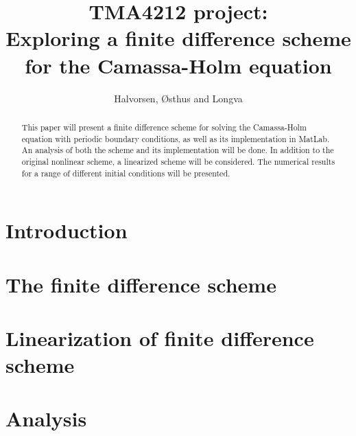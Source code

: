 \documentclass{article}
\title{TMA4212 project: \\ Exploring a finite difference scheme for the Camassa-Holm equation}
\author{Halvorsen, Østhus and Longva}
\begin{document}
\maketitle

\begin{abstract}
This paper will present a finite difference scheme for solving the Camassa-Holm equation with periodic boundary conditions, as well as its implementation in MatLab. An analysis of both the scheme and its implementation will be done. In addition to the original nonlinear scheme, a linearized scheme will be considered. The numerical results for a range of different initial conditions will be presented. 
\end{abstract}

\newpage

\section*{Introduction}


\newpage

\section*{The finite difference scheme}


\newpage

\section*{Linearization of finite difference scheme}


\newpage

\section*{Analysis}



{}

\end{document}
